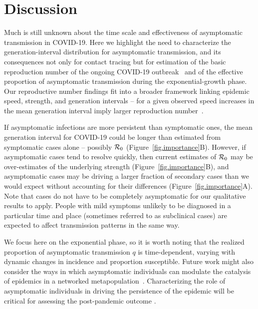 \section{Discussion}

Much is still unknown about the time scale and effectiveness of asymptomatic transmission in COVID-19.
Here we highlight the need to characterize the generation-interval distribution for asymptomatic transmission, and its consequences not only for contact tracing but for estimation of the basic reproduction number of the ongoing COVID-19 outbreak~\citep{park_preprint} and of the effective proportion of asymptomatic transmission during the exponential-growth phase.
Our reproductive number findings fit into a broader framework linking epidemic speed, strength, and generation intervals -- for a given observed speed increases in the mean generation interval imply larger reproduction number~\citep{wearing2005appropriate, roberts2007model, wallinga2007generation, powers2014impact, park_2019practical}.

If asymptomatic infections are more persistent than symptomatic ones, the mean generation interval for COVID-19 could be longer than estimated from symptomatic cases alone -- possibly \DIFdelbegin {}\DIFdelend \DIFaddbegin {}\DIFaddend ${\cal{R}}_0$ \DIFaddbegin {}\DIFaddend (Figure~\ref{fig.importance}B).
However, if asymptomatic cases tend to resolve quickly, then current estimates of ${\cal{R}}_0$ may be over-estimates of the underlying strength (Figure~\ref{fig.importance}B), and asymptomatic cases may be driving a larger fraction of secondary cases than we would expect without accounting for their differences (Figure~\ref{fig.importance}A)\DIFaddbegin {}\DIFaddend .
Note that cases do not have to be completely asymptomatic for our qualitative results to apply.
People with mild symptoms unlikely to be diagnosed in a particular time and place (sometimes referred to as subclinical cases) are expected to affect transmission patterns in the same way.

We focus here on the exponential phase, so it is worth noting that the realized proportion of asymptomatic transmission $q$ is time-dependent, varying with dynamic changes in incidence and proportion susceptible. 
Future work might also consider the ways in which asymptomatic individuals can modulate the catalysis of epidemics in a networked metapopulation~\citep{watts_pnas2005, chinazzi2020effect, du2020risk}.
Characterizing the role of asymptomatic individuals in driving the persistence of the epidemic will be critical for assessing the post-pandemic outcome \citep{lipsitch_preprint}.
